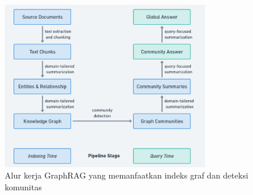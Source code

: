 \begin{figure}[h]
	\centering
	\includegraphics[width=0.8\textwidth]{images/graph-rag-pipeline.png}
	\caption{
		Alur kerja GraphRAG yang memanfaatkan indeks graf dan deteksi komunitas \cite{Edge2025LocalGlobalGraphRAG}
	}
	\label{fig:graphragpipeline}
\end{figure}

